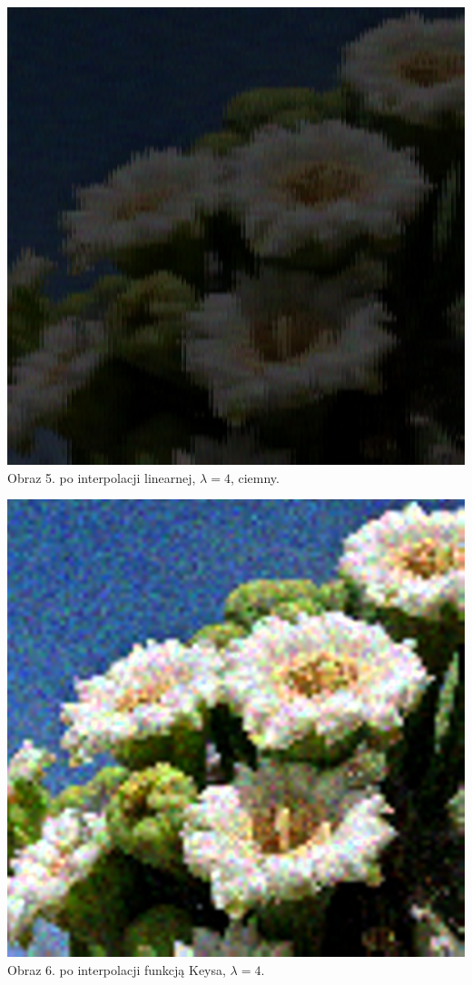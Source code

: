 \documentclass[14pt]{article}
\begin{document}
\begin{center}
    \vspace{0.5cm}
    \includegraphics[scale=0.15]{images/Poisson_bilinear_dark_4x.jpg}
    \\ \small Obraz 5. po interpolacji linearnej, 
    $\lambda = 4$, ciemny.

    \vspace{0.5cm}
    \includegraphics[scale=0.15]{images/Poisson_keys_4x.jpg}
    \\ \small Obraz 6. po interpolacji funkcją Keysa, 
    $\lambda = 4$.


\end{center}
\end{document}
